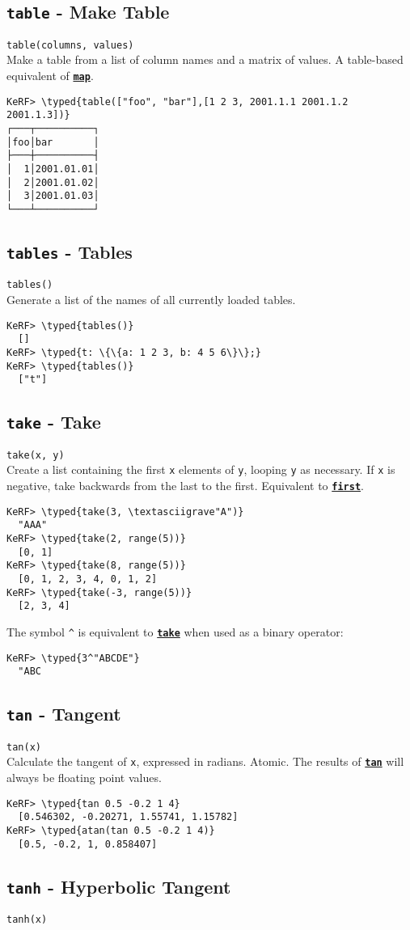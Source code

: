 \documentclass{article}
\newcommand{\typed}[1]{\textcolor{TealBlue}{#1}}
\newcommand{\primdefu}[3]{\subsection{\texttt{#1} - #2}\label{prim:#3}}
\newcommand{\primu}[2]{\hyperref[prim:#2]{\textbf{\texttt{#1}}}}
\newcommand{\primdef}[2]{\primdefu{#1}{#2}{#1}}
\newcommand{\prim}[1]{\primu{#1}{#1}}
\begin{document}
\primdef{table}{Make Table}
\texttt{table(columns, values)}\\

Make a table from a list of column names and a matrix of values. A table-based equivalent of \prim{map}.
\begin{Verbatim}
KeRF> \typed{table(["foo", "bar"],[1 2 3, 2001.1.1 2001.1.2 2001.1.3])}
┌───┬──────────┐
│foo│bar       │
├───┼──────────┤
│  1│2001.01.01│
│  2│2001.01.02│
│  3│2001.01.03│
└───┴──────────┘
\end{Verbatim}

\primdef{tables}{Tables}
\texttt{tables()}\\

Generate a list of the names of all currently loaded tables.
\begin{Verbatim}
KeRF> \typed{tables()}
  []
KeRF> \typed{t: \{\{a: 1 2 3, b: 4 5 6\}\};}
KeRF> \typed{tables()}
  ["t"]
\end{Verbatim}

\pagebreak
\primdef{take}{Take}
\texttt{take(x, y)}\\

Create a list containing the first \texttt{x} elements of \texttt{y}, looping \texttt{y} as necessary. If \texttt{x} is negative, take backwards from the last to the first. Equivalent to \prim{first}.
\begin{Verbatim}
KeRF> \typed{take(3, \textasciigrave"A")}
  "AAA"
KeRF> \typed{take(2, range(5))}
  [0, 1]
KeRF> \typed{take(8, range(5))}
  [0, 1, 2, 3, 4, 0, 1, 2]
KeRF> \typed{take(-3, range(5))}
  [2, 3, 4]
\end{Verbatim}

The symbol \texttt{\^} is equivalent to \prim{take} when used as a binary operator:
\begin{Verbatim}
KeRF> \typed{3^"ABCDE"}
  "ABC
\end{Verbatim}

\primdef{tan}{Tangent}
\texttt{tan(x)}\\

Calculate the tangent of \texttt{x}, expressed in radians. Atomic. The results of \prim{tan} will always be floating point values.
\begin{Verbatim}
KeRF> \typed{tan 0.5 -0.2 1 4}
  [0.546302, -0.20271, 1.55741, 1.15782]
KeRF> \typed{atan(tan 0.5 -0.2 1 4)}
  [0.5, -0.2, 1, 0.858407]
\end{Verbatim}

\primdef{tanh}{Hyperbolic Tangent}
\texttt{tanh(x)}\\
\end{document}
